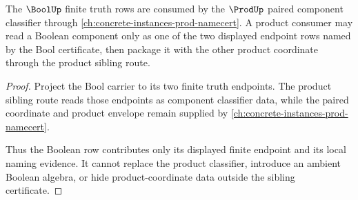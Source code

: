\begin{theorem}
\label{thm:bool-prod-sibling-route}
The $\BoolUp$ finite truth rows are consumed by the $\ProdUp$ paired component classifier through \autoref{ch:concrete-instances-prod-namecert}. A product consumer may read a Boolean component only as one of the two displayed endpoint rows named by the Bool certificate, then package it with the other product coordinate through the product sibling route.
\end{theorem}
\begin{proof}
Project the Bool carrier to its two finite truth endpoints. The product sibling route reads those endpoints as component classifier data, while the paired coordinate and product envelope remain supplied by \autoref{ch:concrete-instances-prod-namecert}.

Thus the Boolean row contributes only its displayed finite endpoint and its local naming evidence. It cannot replace the product classifier, introduce an ambient Boolean algebra, or hide product-coordinate data outside the sibling certificate.
\end{proof}
